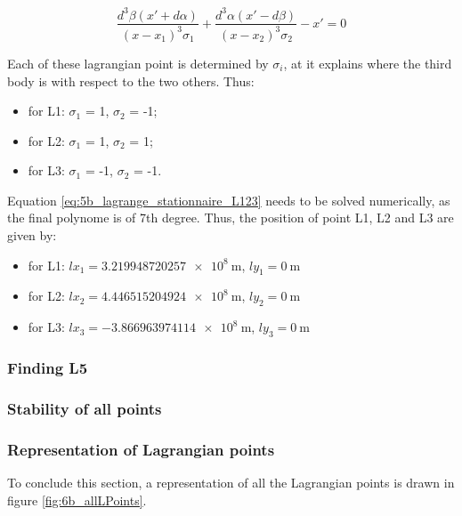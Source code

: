 \documentclass[a4paper,12pt,twoside]{article}
\begin{document}
\begin{equation}
  \frac{d^3\beta\left(x' + d\alpha\right)}{\left(x-x_1\right)^3\sigma_1} + \frac{d^3\alpha\left(x' - d\beta\right)}{\left(x-x_2\right)^3\sigma_2} - x' = 0
  \label{eq:5b_lagrange_stationnaire_L123}
\end{equation}

Each of these lagrangian point is determined by $\sigma_i$, at it explains where the third body is with respect to the two others.
Thus:
\begin{itemize}
  \item for L1: $\sigma_1$ = 1, $\sigma_2$ = -1;
  \item for L2: $\sigma_1$ = 1, $\sigma_2$ = 1;
  \item for L3: $\sigma_1$ = -1, $\sigma_2$ = -1.
\end{itemize}

Equation \eqref{eq:5b_lagrange_stationnaire_L123} needs to be solved numerically, as the final polynome is of 7th degree.
Thus, the position of point L1, L2 and L3 are given by:
\begin{itemize}
  \item for L1: $lx_1 = \SI{3.219948720257e8}{\m}$, $ly_1 = \SI{0}{\m}$
  \item for L2: $lx_2 = \SI{4.446515204924e8}{\m}$, $ly_2 = \SI{0}{\m}$
  \item for L3: $lx_3 = \SI{-3.866963974114e8}{\m}$, $ly_3 = \SI{0}{\m}$
\end{itemize}

\subsubsection{Finding L5}

\subsubsection{Stability of all points}


\subsubsection{Representation of Lagrangian points}
To conclude this section, a representation of all the Lagrangian points is drawn in figure \ref{fig:6b_allLPoints}.
\end{document}
